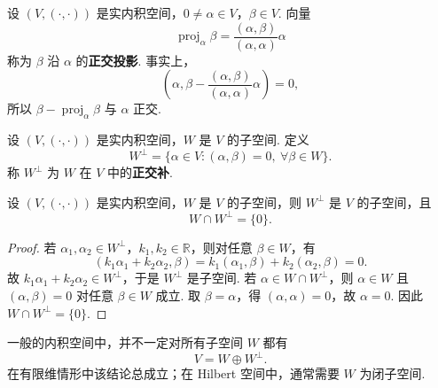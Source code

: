 \begin{definition}
	设 $(V,(\cdot,\cdot))$ 是实内积空间，$0\ne\alpha\in V$，$\beta\in V$. 向量
	\[
	\operatorname{proj}_{\alpha}\beta=\frac{(\alpha,\beta)}{(\alpha,\alpha)}\alpha
	\]
	称为 $\beta$ 沿 $\alpha$ 的\textbf{正交投影}. 事实上，
	\[
	\left(\alpha,\beta-\frac{(\alpha,\beta)}{(\alpha,\alpha)}\alpha\right)=0,
	\]
	所以 $\beta-\operatorname{proj}_{\alpha}\beta$ 与 $\alpha$ 正交.
\end{definition}

\begin{definition}
	设 $(V,(\cdot,\cdot))$ 是实内积空间，$W$ 是 $V$ 的子空间. 定义
	\[
	W^{\perp}=\{\alpha\in V:(\alpha,\beta)=0,\ \forall\beta\in W\}.
	\]
	称 $W^{\perp}$ 为 $W$ 在 $V$ 中的\textbf{正交补}.
\end{definition}

\begin{proposition}
	设 $(V,(\cdot,\cdot))$ 是实内积空间，$W$ 是 $V$ 的子空间，则 $W^{\perp}$ 是 $V$ 的子空间，且
	\[
	W\cap W^{\perp}=\{0\}.
	\]
\end{proposition}
\begin{proof}
	若 $\alpha_1,\alpha_2\in W^{\perp}$，$k_1,k_2\in\mathbb{R}$，则对任意 $\beta\in W$，有
	\[
	(k_1\alpha_1+k_2\alpha_2,\beta)=k_1(\alpha_1,\beta)+k_2(\alpha_2,\beta)=0.
	\]
	故 $k_1\alpha_1+k_2\alpha_2\in W^{\perp}$，于是 $W^{\perp}$ 是子空间.
	若 $\alpha\in W\cap W^{\perp}$，则 $\alpha\in W$ 且 $(\alpha,\beta)=0$ 对任意 $\beta\in W$ 成立. 取 $\beta=\alpha$，得 $(\alpha,\alpha)=0$，故 $\alpha=0$. 因此 $W\cap W^{\perp}=\{0\}$.
\end{proof}


	一般的内积空间中，并不一定对所有子空间 $W$ 都有
	\[
	V=W\oplus W^{\perp}.
	\]
	在有限维情形中该结论总成立；在 Hilbert 空间中，通常需要 $W$ 为闭子空间.




